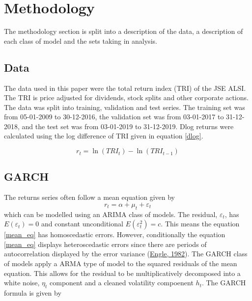 \documentclass[11pt,preprint, authoryear]{elsarticle}
\numberwithin{equation}{section}
\numberwithin{figure}{section}
\numberwithin{table}{section}
\begin{document}
\hypertarget{methodology}{%
\section{\texorpdfstring{Methodology
\label{Meth}}{Methodology }}\label{methodology}}

The methodology section is split into a description of the data, a
description of each class of model and the sets taking in analysis.

\hypertarget{data}{%
\subsection{Data}\label{data}}

The data used in this paper were the total return index (TRI) of the JSE
ALSI. The TRI is price adjusted for dividends, stock splits and other
corporate actions. The data was split into training, validation and test
series. The training set was from 05-01-2009 to 30-12-2016, the
validation set was from 03-01-2017 to 31-12-2018, and the test set was
from 03-01-2019 to 31-12-2019. Dlog returns were calculated using the
log difference of TRI given in equation \ref{dlog}.

\begin{equation}\label{dlog}
r_t = \ln(TRI_t) - \ln(TRI_{t-1})
\end{equation}

\hypertarget{garch}{%
\subsection{GARCH}\label{garch}}

The returns series often follow a mean equation given by
\begin{equation}\label{mean_eq}
r_t = \alpha + \mu_t + \varepsilon_t
\end{equation} which can be modelled using an ARIMA class of models. The
residual, \(\varepsilon_t\), has \(E(\varepsilon_t)=0\) and constant
unconditional \(E(\varepsilon_t^2) = c\). This means the equation
\ref{mean_eq} has homoscedastic errors. However, conditionally the
equation \ref{mean_eq} displays heteroscedastic errors since there are
periods of autocorrelation displayed by the error variance
(\protect\hyperlink{ref-engle}{Engle, 1982}). The GARCH class of models
apply a ARMA type of model to the squared residuals of the mean
equation. This allows for the residual to be multiplicatively decomposed
into a white noise, \(\eta_t\) component and a cleaned volatility
compoenent \(h_t\). The GARCH formula is given by
\end{document}
